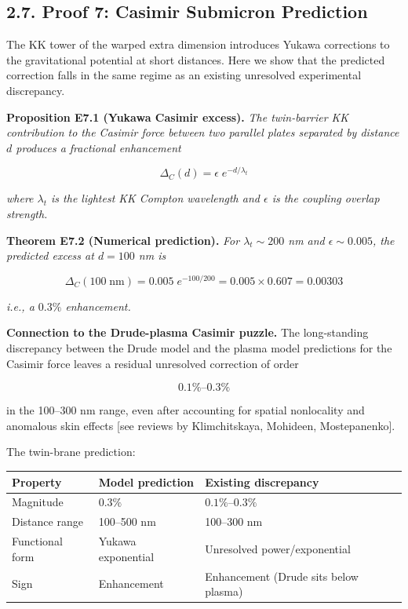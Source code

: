 \documentclass[
  11pt,
]{article}
\begin{document}
\bigskip

\hypertarget{proof-7-casimir-submicron-prediction}{%
\subsection{2.7. Proof 7: Casimir Submicron
Prediction}\label{proof-7-casimir-submicron-prediction}}

The KK tower of the warped extra dimension introduces Yukawa corrections
to the gravitational potential at short distances. Here we show that the
predicted correction falls in the same regime as an existing unresolved
experimental discrepancy.

\textbf{Proposition E7.1 (Yukawa Casimir excess).} \emph{The
twin-barrier KK contribution to the Casimir force between two parallel
plates separated by distance \(d\) produces a fractional enhancement}

\[\Delta_C(d) = \epsilon\;e^{-d/\lambda_t} \tag{88}\]

\emph{where \(\lambda_t\) is the lightest KK Compton wavelength and
\(\epsilon\) is the coupling overlap strength.}

\textbf{Theorem E7.2 (Numerical prediction).} \emph{For
\(\lambda_t \sim 200\) nm and \(\epsilon \sim 0.005\), the predicted
excess at \(d = 100\) nm is}

\[\Delta_C(100\;\text{nm}) = 0.005\;e^{-100/200} = 0.005 \times 0.607 = 0.00303 \tag{89}\]

\emph{i.e., a \(0.3\%\) enhancement.}

\textbf{Connection to the Drude-plasma Casimir puzzle.} The
long-standing discrepancy between the Drude model and the plasma model
predictions for the Casimir force leaves a residual unresolved
correction of order

\[0.1\%\text{--}0.3\% \tag{90}\]

in the 100--300 nm range, even after accounting for spatial nonlocality
and anomalous skin effects {[}see reviews by Klimchitskaya, Mohideen,
Mostepanenko{]}.

The twin-brane prediction:

\begin{longtable}[]{@{}lll@{}}
\toprule
Property & Model prediction & Existing discrepancy\tabularnewline
\midrule
\endhead
Magnitude & \(0.3\%\) & \(0.1\%\)--\(0.3\%\)\tabularnewline
Distance range & 100--500 nm & 100--300 nm\tabularnewline
Functional form & Yukawa exponential & Unresolved
power/exponential\tabularnewline
Sign & Enhancement & Enhancement (Drude sits below
plasma)\tabularnewline
\bottomrule
\end{longtable}
\end{document}
